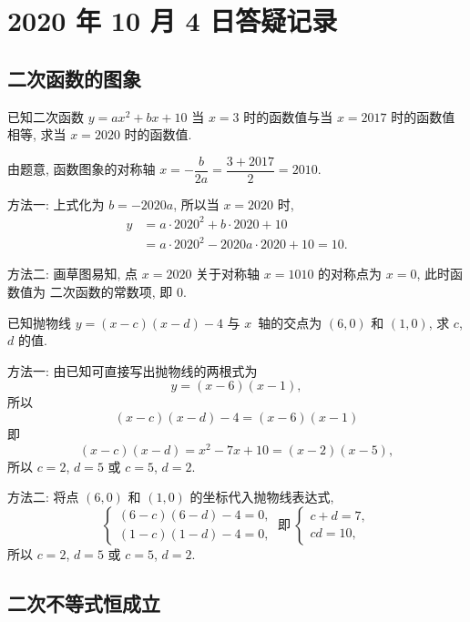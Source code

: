 \section{2020 年 10 月 4 日答疑记录}

\subsection{二次函数的图象}

\begin{example}
  已知二次函数 $y=ax^2+bx+10$ 当 $x=3$ 时的函数值与当 $x=2017$ 时的函数值相等, 求当 $x=2020$ 时的函数值.
\end{example}
\begin{solution}
  由题意, 函数图象的对称轴 $x=-\dfrac{b}{2a}=\dfrac{3+2017}2=2010$.
  
  方法一: 上式化为 $b=-2020a$, 所以当 $x=2020$ 时, 
  \begin{align*}
    y&= a\cdot 2020^2+b\cdot 2020+10\\
     &= a\cdot 2020^2-2020a\cdot 2020+10
      = 10.\end{align*}
  
  方法二: 画草图易知, 点 $x=2020$ 关于对称轴 $x=1010$ 的对称点为 $x=0$, 此时函数值为 二次函数的常数项, 即 $0$.
\end{solution}

\begin{example}
  已知抛物线 $y=(x-c)(x-d)-4$ 与 $x$~轴的交点为 $(6,0)$ 和 $(1,0)$, 求 $c$, $d$ 的值.
\end{example}
\begin{solution}
  方法一: 由已知可直接写出抛物线的两根式为 
  \[y=(x-6)(x-1),\]
  所以
  \[(x-c)(x-d)-4=(x-6)(x-1)\]
  即
  \[(x-c)(x-d)= x^2-7x+10=(x-2)(x-5),\]
  所以 $c=2$, $d=5$ 或 $c=5$, $d=2$.
  
  方法二: 将点 $(6,0)$ 和 $(1,0)$ 的坐标代入抛物线表达式,
  \[\left\{\!\!\begin{array}{l}
      (6-c)(6-d)-4=0,\\
      (1-c)(1-d)-4=0,
    \end{array}\right.\ \text{即}\ 
    \left\{\!\!\begin{array}{l}
      c+d=7,\\
      cd=10,
    \end{array}\right.\]
  所以 $c=2$, $d=5$ 或 $c=5$, $d=2$.
\end{solution}

\subsection{二次不等式恒成立}

